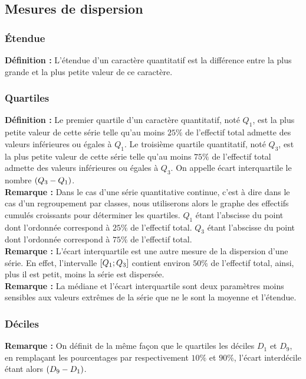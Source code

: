 \documentclass[a4paper,titlepage]{article}
\let\oldleft\left
\renewcommand{\left}{\mathopen{}\mathclose\bgroup\oldleft}
\let\oldright\right
\renewcommand{\right}{\aftergroup\egroup\oldright}
\begin{document}
    \subsection{Mesures de dispersion}
        \subsubsection{Étendue}
            \textbf{Définition :} L’étendue d’un caractère quantitatif est la différence entre la plus grande et la plus petite valeur de ce caractère.
        \subsubsection{Quartiles}
            \textbf{Définition :} Le premier quartile d’un caractère quantitatif, noté $Q_{1}$, est la plus petite valeur de cette série telle qu’au moins $25\%$ de l’effectif total admette des valeurs inférieures ou égales à $Q_{1}$. Le troisième quartile quantitatif, noté $Q_{3}$, est la plus petite valeur de cette série telle qu’au moins $75\%$ de l’effectif total admette des valeurs inférieures ou égales à $Q_{3}$. On appelle écart interquartile le nombre $\left(Q_{3}-Q_{1}\right)$.
            \\
            \textbf{Remarque :} Dans le cas d’une série quantitative continue, c’est à dire dans le cas d’un regroupement par classes, nous utiliserons alors le graphe des effectifs cumulés croissants pour déterminer les quartiles. $Q_{1}$ étant l’abscisse du point dont l’ordonnée correspond à $25\%$ de l’effectif total. $Q_{3}$ étant l’abscisse du point dont l’ordonnée correspond à $75\%$ de l’effectif total.
            \\
            \textbf{Remarque :} L’écart interquartile est une autre mesure de la dispersion d’une série. En effet, l’intervalle $\left[Q_{1};Q_{3}\right]$ contient environ $50\%$ de l’effectif total, ainsi, plus il est petit, moins la série est dispersée.
            \\
            \textbf{Remarque :} La médiane et l’écart interquartile sont deux paramètres moins sensibles aux valeurs extrêmes de la série que ne le sont la moyenne et l’étendue.
        \subsubsection{Déciles}
            \textbf{Remarque :} On définit de la même façon que le quartiles les déciles $D_{1}$ et $D_{9}$, en remplaçant les pourcentages par respectivement $10\%$ et $90\%$, l’écart interdécile étant alors $\left(D_{9}-D_{1}\right)$.
\end{document}
